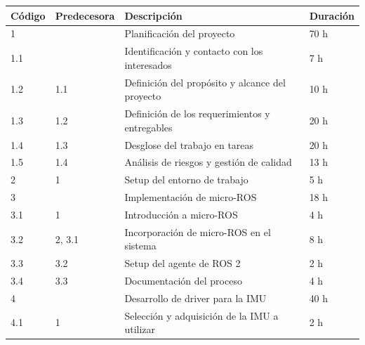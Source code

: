 \documentclass[
11pt, %
codirector, %
]{charter}
\begin{document}
\begin{table}[htpb]
\centering
\label{tab:wbs}
\begin{tabular}{@{}llll@{}}
\toprule
\textbf{Código} & \textbf{Predecesora} & \textbf{Descripción}                               & \textbf{Duración} \\ \midrule
1               &                      & Planificación del proyecto                         & 70 h               \\
1.1             &                      & Identificación y contacto con los interesados       & 7 h                \\
1.2             & 1.1                  & Definición del propósito y alcance del proyecto    & 10 h               \\
1.3             & 1.2                  & Definición de los requerimientos y entregables     & 20 h               \\
1.4             & 1.3                  & Desglose del trabajo en tareas                     & 20 h               \\
1.5             & 1.4                  & Análisis de riesgos y gestión de calidad           & 13 h               \\
2               & 1                    & Setup del entorno de trabajo                       & 5 h                \\
3               &                      & Implementación de micro-ROS                        & 18 h               \\
3.1             & 1                    & Introducción a micro-ROS                           & 4 h                \\
3.2             & 2, 3.1               & Incorporación de micro-ROS en el sistema           & 8 h                \\
3.3             & 3.2                  & Setup del agente de ROS 2                          & 2 h                \\
3.4             & 3.3                  & Documentación del proceso                          & 4 h                \\
4               &                      & Desarrollo de driver para la IMU                   & 40 h               \\
4.1             & 1                    & Selección y adquisición de la IMU a utilizar       & 2 h                \\

\end{tabular}
\end{table}
\end{document}
